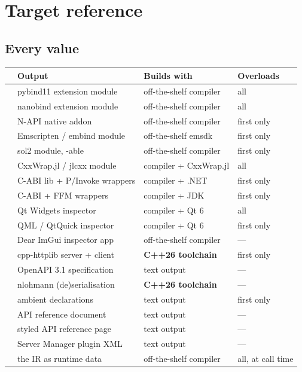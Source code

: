 \chapter{Target reference}
\label{app:targets}

\section{Every  value}

\begin{center}
\small
\begin{longtable}{@{}lL{4.2cm}L{3.4cm}L{2.6cm}@{}}
\toprule
\textbf{} & \textbf{Output} & \textbf{Builds with} &
  \textbf{Overloads} \\
\midrule
\endhead
{} & pybind11 extension module & off-the-shelf compiler & all \\
 & nanobind extension module & off-the-shelf compiler & all \\
 & N-API native addon & off-the-shelf compiler & first only \\
 & Emscripten / embind module & off-the-shelf emsdk & first only \\
 & sol2 module, -able & off-the-shelf compiler & first only \\
 & CxxWrap.jl / jlcxx module & compiler + CxxWrap.jl & all \\
 & C-ABI lib + P/Invoke wrappers & compiler + .NET & first only \\
 & C-ABI + FFM wrappers & compiler + JDK & first only \\
 & Qt Widgets inspector & compiler + Qt 6 & all \\
 & QML / QtQuick inspector & compiler + Qt 6 & first only \\
 & Dear ImGui inspector app & off-the-shelf compiler & --- \\
 & cpp-httplib server + client & \textbf{C++26 toolchain} & first only \\
 & OpenAPI 3.1 specification & text output & --- \\
 & nlohmann (de)serialisation & \textbf{C++26 toolchain} & --- \\
 & ambient  declarations & text output & first only \\
 & API reference document & text output & --- \\
 & styled API reference page & text output & --- \\
 & Server Manager plugin XML & text output & --- \\
 & the IR as runtime data & off-the-shelf compiler & all, at
  call time \\
\bottomrule
\end{longtable}
\end{center}

